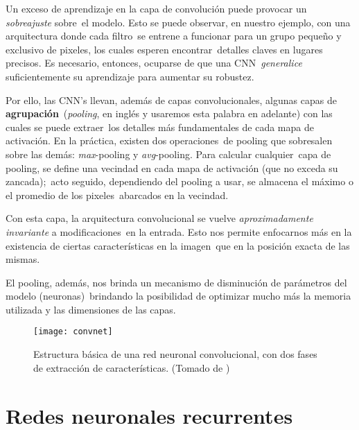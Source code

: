 \noindent
Un exceso de aprendizaje en la capa de convolución puede provocar un \emph{sobreajuste} sobre\
el modelo. Esto se puede observar, en nuestro ejemplo, con una arquitectura donde cada filtro\
se entrene a funcionar para un grupo pequeño y exclusivo de pixeles, los cuales esperen encontrar\
detalles claves en lugares precisos. Es necesario, entonces, ocuparse de que una CNN\
\emph{generalice} suficientemente su aprendizaje para aumentar su robustez.\par
Por ello, las CNN's llevan, además de capas convolucionales, algunas capas de \textbf{agrupación}\
(\emph{pooling}, en inglés y usaremos esta palabra en adelante) con las cuales se puede extraer\
los detalles más fundamentales de cada mapa de activación. En la práctica, existen dos operaciones\
de pooling que sobresalen sobre las demás: \emph{max}-pooling y \emph{avg}-pooling. Para calcular cualquier\
capa de pooling, se define una vecindad en cada mapa de activación (que no exceda su zancada);\
acto seguido, dependiendo del pooling a usar, se almacena el máximo o el promedio de los pixeles\
abarcados en la vecindad.\par
Con esta capa, la arquitectura convolucional se vuelve \textit{aproximadamente \emph{invariante}} a modificaciones\
en la entrada. Esto nos permite enfocarnos más en la existencia de ciertas características en la imagen\
que en la posición exacta de las mismas.\par
El pooling, además, nos brinda un mecanismo de disminución de parámetros del modelo (neuronas)\
brindando la posibilidad de optimizar mucho más la memoria utilizada y las dimensiones de las capas.

\begin{figure}
  \centering
  \texttt{[image: convnet]}
  \caption{Estructura básica de una red neuronal convolucional, con dos fases de extracción de características.
    (Tomado de \cite{lecun2010})}
  \label{convnet_fig}
\end{figure}


\section{Redes neuronales recurrentes}

